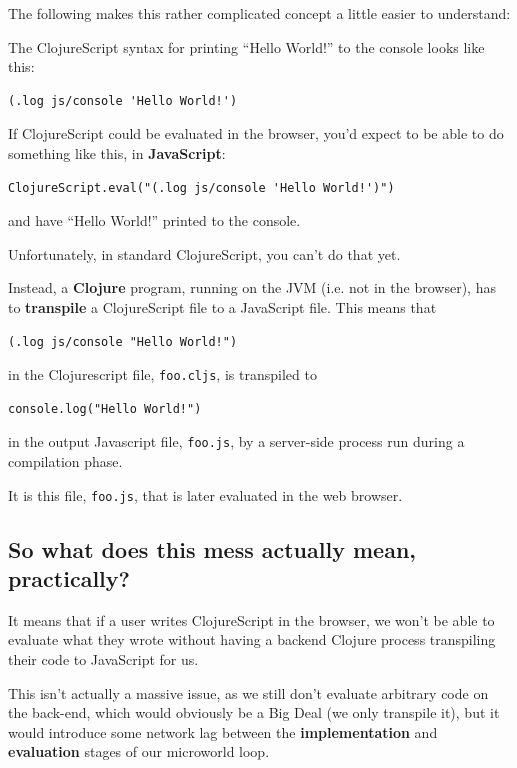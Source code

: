 The following makes this rather complicated concept a little easier to
understand:

The ClojureScript syntax for printing ``Hello World!'' to the console
looks like this: 

\begin{verbatim}
(.log js/console 'Hello World!')
\end{verbatim}

If ClojureScript could be evaluated in the browser, you'd expect to be
able to do something like this, in \textbf{JavaScript}: 

\begin{verbatim}
ClojureScript.eval("(.log js/console 'Hello World!')") 
\end{verbatim}

and have ``Hello World!'' printed to the console.

Unfortunately, in standard ClojureScript, you can't do that yet.

Instead, a \textbf{Clojure} program, running on the JVM (i.e. not in the browser), has to \textbf{transpile} a ClojureScript file to a
JavaScript file. This means that 

\begin{verbatim}
(.log js/console "Hello World!")
\end{verbatim}

in the Clojurescript file, \texttt{foo.cljs}, is transpiled to

\begin{verbatim}
console.log("Hello World!")
\end{verbatim}

in the output Javascript file, \texttt{foo.js}, by a server-side process run during a compilation phase. 

It is this file, \texttt{foo.js}, that is later evaluated in the web browser.

\subsection{So what does this mess actually mean, practically?}

It means that if a user writes ClojureScript in the browser, we won't be
able to evaluate what they wrote without having a backend Clojure
process transpiling their code to JavaScript for us.

This isn't actually a massive issue, as we still don't evaluate
arbitrary code on the back-end, which would obviously be a Big Deal (we
only transpile it), but it would introduce some network lag
between the \textbf{implementation} and \textbf{evaluation} stages of
our microworld loop.

